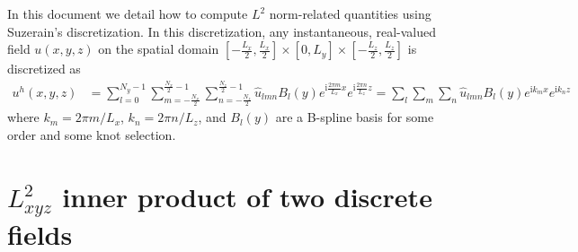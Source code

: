 \documentclass[letterpaper,11pt,nointlimits,reqno]{amsart}
\newcommand{\ii}{\ensuremath{\mathrm{i}}}
\begin{document}
In this document we detail how to compute $L^2$ norm-related quantities using
Suzerain's discretization.  In this discretization, any instantaneous,
real-valued field $u\!\left(x,y,z\right)$ on the spatial domain
$\left[-\frac{L_x}{2},\frac{L_x}{2}\right] \times{} [0,L_y] \times{}
\left[-\frac{L_z}{2},\frac{L_z}{2}\right]$ is discretized as
\begin{align}
  u^h(x,y,z)
&=
  \sum_{l=0}^{N_y - 1}
  \sum_{m=-\frac{N_x}{2}}^{\frac{N_x}{2}-1}
  \sum_{n=-\frac{N_z}{2}}^{\frac{N_z}{2}-1}
  \hat{u}_{l m n}
  B_l\!\left(y\right)
  e^{\ii\frac{2\pi{}m}{L_x}x}
  e^{\ii\frac{2\pi{}n}{L_z}z}
=
  \sum_{l}\sum_{m}\sum_{n}
  \hat{u}_{l m n}B_l\!\left(y\right)e^{\ii k_m x}e^{\ii k_n z}
\end{align}
where $k_m = 2\pi{}m/L_x$, $k_n = 2\pi{}n/L_z$, and $B_l\!\left(y\right)$ are a
B-spline basis for some order and some knot selection.

\section{$L_{xyz}^2$ inner product of two discrete fields}
\end{document}
